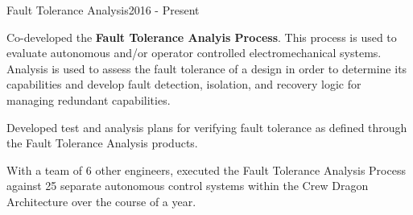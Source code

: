 \begin{cventries}
  \cventry
  {Fault Tolerance Analysis}{}{}{2016 - Present}
  {
    \begin{cvitems}
    \item Co-developed the \textbf{Fault Tolerance Analyis Process}. This
      process is used to evaluate autonomous and/or operator controlled
      electromechanical systems. Analysis is used to assess the fault
      tolerance of a design in order to determine its capabilities and
      develop fault detection, isolation, and recovery logic for managing
      redundant capabilities.
    \item Developed test and analysis plans for verifying fault tolerance
      as defined through the Fault Tolerance Analysis products.
    \item With a team of 6 other engineers, executed the Fault Tolerance
      Analysis Process against 25 separate autonomous control systems
      within the Crew Dragon Architecture over the course of a year.
    \end{cvitems}
  }
\end{cventries}

